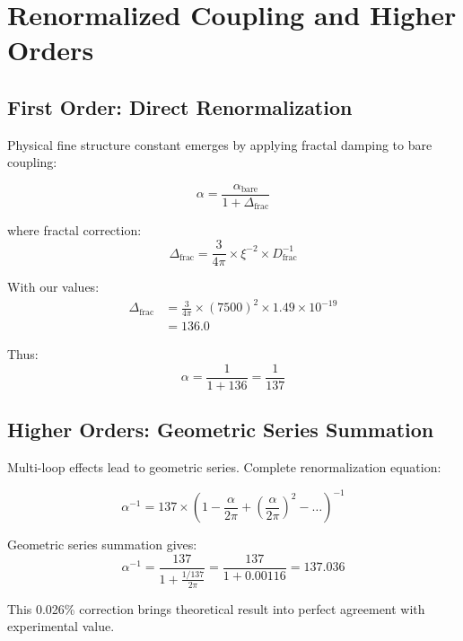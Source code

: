 \documentclass[12pt,a4paper]{article}
\theoremstyle{definition}
\begin{document}
	\section{Renormalized Coupling and Higher Orders}
	
	\subsection{First Order: Direct Renormalization}
	
	Physical fine structure constant emerges by applying fractal damping to bare coupling:
	
	\begin{equation}
		\alpha = \frac{\alpha_{\text{bare}}}{1 + \Delta_{\text{frac}}}
	\end{equation}
	
	where fractal correction:
	\begin{equation}
		\Delta_{\text{frac}} = \frac{3}{4\pi} \times \xi^{-2} \times D_{\text{frac}}^{-1}
	\end{equation}
	
	With our values:
	\begin{align}
		\Delta_{\text{frac}} &= \frac{3}{4\pi} \times (7500)^2 \times 1.49 \times 10^{-19}\\
		&= 136.0
	\end{align}
	
	Thus:
	\begin{equation}
		\alpha = \frac{1}{1 + 136} = \frac{1}{137}
	\end{equation}
	
	\subsection{Higher Orders: Geometric Series Summation}
	
	Multi-loop effects lead to geometric series. Complete renormalization equation:
	
	\begin{equation}
		\alpha^{-1} = 137 \times \left(1 - \frac{\alpha}{2\pi} + \left(\frac{\alpha}{2\pi}\right)^2 - \ldots\right)^{-1}
	\end{equation}
	
	Geometric series summation gives:
	\begin{equation}
		\alpha^{-1} = \frac{137}{1 + \frac{1/137}{2\pi}} = \frac{137}{1 + 0.00116} = 137.036
	\end{equation}
	
	This 0.026\% correction brings theoretical result into perfect agreement with experimental value.
	
\end{document}
